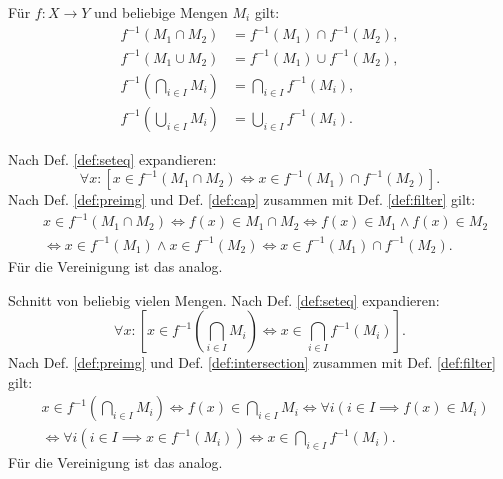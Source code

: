 \begin{Satz}%
\label{preimg-dl}\newlinefirst
Für $f\colon X\to Y$ und beliebige Mengen $M_i$ gilt:%
\begin{align}
f^{-1}(M_1\cap M_2) &= f^{-1}(M_1)\cap f^{-1}(M_2),\\
f^{-1}(M_1\cup M_2) &= f^{-1}(M_1)\cup f^{-1}(M_2),\\
f^{-1}(\bigcap_{i\in I} M_i) &= \bigcap_{i\in I} f^{-1}(M_i),\\
f^{-1}(\bigcup_{i\in I} M_i) &= \bigcup_{i\in I} f^{-1}(M_i).
\end{align}
\end{Satz}

\begin{Beweis}
Nach Def. \ref{def:seteq} expandieren:
\[\forall x\colon [x\in f^{-1}(M_1\cap M_2)\iff x\in f^{-1}(M_1)\cap f^{-1}(M_2)].\]
Nach Def. \ref{def:preimg} und Def. \ref{def:cap}
zusammen mit Def. \ref{def:filter} gilt:
\begin{align*}
& x\in f^{-1}(M_1\cap M_2) \iff f(x)\in M_1\cap M_2
\iff f(x)\in M_1\land f(x)\in M_2\\
&\iff x\in f^{-1}(M_1)\land x\in f^{-1}(M_2)
\iff x\in f^{-1}(M_1)\cap f^{-1}(M_2).
\end{align*}
Für die Vereinigung ist das analog.

Schnitt von beliebig vielen Mengen.
Nach Def. \ref{def:seteq} expandieren:
\[\forall x\colon [x\in f^{-1}(\bigcap_{i\in I}M_i)
\iff x\in \bigcap_{i\in I} f^{-1}(M_i)].\]
Nach Def. \ref{def:preimg} und Def. \ref{def:intersection}
zusammen mit Def. \ref{def:filter} gilt:
\begin{align*}
& x\in f^{-1}(\bigcap_{i\in I} M_i)\iff f(x)\in\bigcap_{i\in I} M_i
\iff \forall i(i\in I\implies f(x)\in M_i)\\
&\iff \forall i(i\in I\implies x\in f^{-1}(M_i))
\iff x\in \bigcap_{i\in I} f^{-1}(M_i).
\end{align*}
Für die Vereinigung ist das analog.\;\qedsymbol
\end{Beweis}

